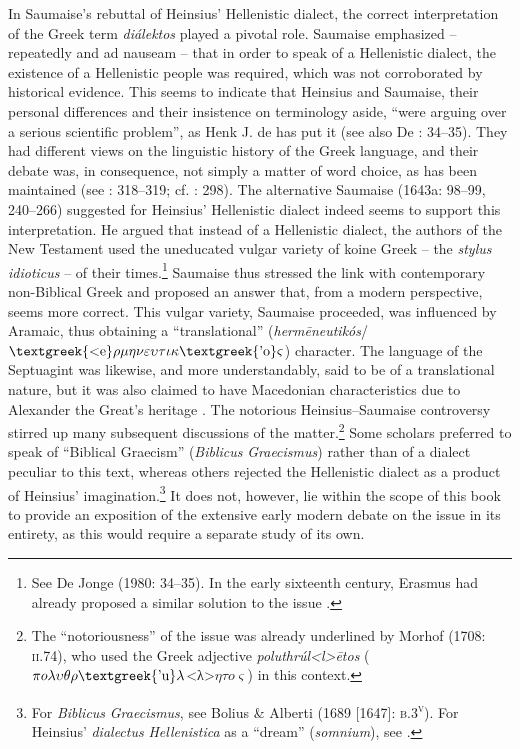 In Saumaise’s rebuttal of Heinsius’ Hellenistic dialect, the correct interpretation of the Greek term \textit{diálektos} played a pivotal role. Saumaise emphasized – repeatedly and ad nauseam – that in order to speak of a Hellenistic dialect, the existence of a Hellenistic people was required, which was not corroborated by historical evidence. This seems to indicate that Heinsius and Saumaise, their personal differences and their insistence on terminology aside, “were arguing over a serious scientific problem”, as Henk J. de \citet[117]{Jonge1981} has put it (see also De \citealt{Jonge1980}: 34–35). They had different views on the linguistic history of the Greek language, and their debate was, in consequence, not simply a matter of word choice, as has been maintained (see \citealt{Simon1689}: 318–319; cf. \citealt{Considine2012}: 298). The alternative Saumaise (1643a: 98–99, 240–266) suggested for Heinsius’ Hellenistic dialect indeed seems to support this interpretation. He argued that instead of a Hellenistic dialect, the authors of the New Testament used the uneducated vulgar variety of koine Greek – the \textit{stylus} \textit{idioticus} – of their times.\footnote{See De Jonge (1980: 34–35). In the early sixteenth century, Erasmus had already proposed a similar solution to the issue \citep[181]{Bentley1983}.} Saumaise thus stressed the link with contemporary non-Biblical Greek and proposed an answer that, from a modern perspective, seems more correct. This vulgar variety, Saumaise proceeded, was influenced by Aramaic, thus obtaining a “translational” (\textit{hermēneutikós}/$\text{\textgreek{<e}}\rho \mu \eta \nu \varepsilon \upsilon \tau \iota \kappa \text{\textgreek{'o}}\varsigma $) character. The language of the Septuagint was likewise, and more understandably, said to be of a translational nature, but it was also claimed to have Macedonian characteristics due to Alexander the Great’s heritage \citep[264]{Saumaise1643a}. The notorious Heinsius–Saumaise controversy stirred up many subsequent discussions of the matter.\footnote{The “notoriousness” of the issue was already underlined by Morhof (1708: \textsc{ii.}74), who used the Greek adjective \textit{poluthrúl<l>ētos}  ($\pi o\lambda \upsilon \theta \rho \text{\textgreek{'u}}\lambda $<λ>$\eta \tau o\varsigma $) in this context.} Some scholars preferred to speak of “Biblical Graecism” (\textit{Biblicus} \textit{Graecismus}) rather than of a dialect peculiar to this text, whereas others rejected the Hellenistic dialect as a product of Heinsius’ imagination.\footnote{For \textit{Biblicus} \textit{Graecismus}, see Bolius \& Alberti (1689 [1647]: \textsc{b.3}\textsc{\textsuperscript{v}}). For Heinsius’ \textit{dialectus} \textit{Hellenistica} as a “dream” (\textit{somnium}), see \citet{Croy1644}.} It does not, however, lie within the scope of this book to provide an exposition of the extensive early modern debate on the issue in its entirety, as this would require a separate study of its own.

